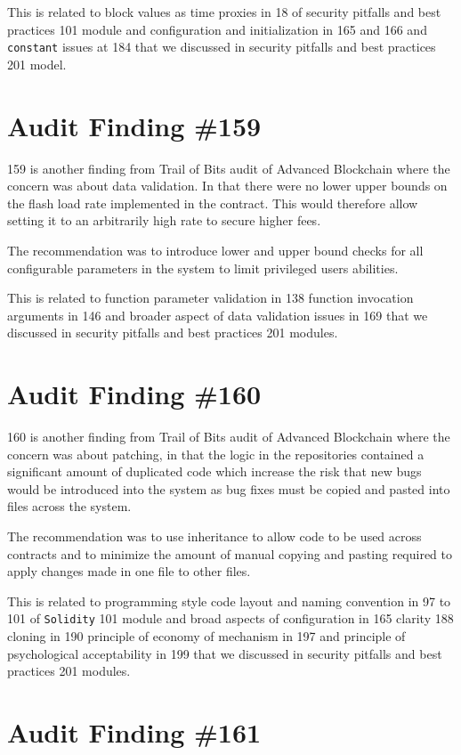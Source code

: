 This is related to block values as time proxies in 18 of security pitfalls and best practices 101 module and configuration and initialization in 165 and 166 and \verb|constant| issues at 184 that we discussed in security pitfalls and best practices 201 model.

\section{Audit Finding \#159}

159 is another finding from Trail of Bits audit of Advanced Blockchain where the concern was about data validation. In that there were no lower upper bounds on the flash load rate implemented in the contract. This would therefore allow setting it to an arbitrarily high rate to secure higher fees.

The recommendation was to introduce lower and upper bound checks for all configurable parameters in the system to limit privileged users abilities.

This is related to function parameter validation in 138 function invocation arguments in 146 and broader aspect of data validation issues in 169 that we discussed in security pitfalls and best practices 201 modules.

\section{Audit Finding \#160}

160 is another finding from Trail of Bits audit of Advanced Blockchain where the concern was about patching, in that the logic in the repositories contained a significant amount of duplicated code which increase the risk that new bugs would be introduced into the system as bug fixes must be copied and pasted into files across the system.

The recommendation was to use inheritance to allow code to be used across contracts and to minimize the amount of manual copying and pasting required to apply changes made in one file to other files.

This is related to programming style code layout and naming convention in 97 to 101 of \verb|Solidity| 101 module and broad aspects of configuration in 165 clarity 188 cloning in 190 principle of economy of mechanism in 197 and principle of psychological acceptability in 199 that we discussed in security pitfalls and best practices 201 modules.

\section{Audit Finding \#161}

